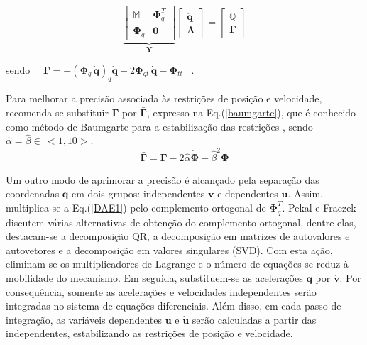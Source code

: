 \documentclass[]{politex}
\begin{document}
\begin{equation}
\underbrace{\left[ \begin{array}{cc}
\mathbb{M} & \boldsymbol{\Phi}_q^T \\
\boldsymbol{\Phi}_q & \mathbf{0}
\end{array}
\right]}_{\mathbf{Y}}
\left[ \begin{array}{c}
\ddot{\mathbf{q}} \\
\boldsymbol{\Lambda}
\end{array}
\right] =
\left[ \begin{array}{c}
\mathbb{Q} \\
\boldsymbol{\Gamma}
\end{array}
\right]
\label{DAE3}
\end{equation}

\vspace{0.5cm}

sendo  \, \, $\boldsymbol{\Gamma} = -(\boldsymbol{\Phi}_q \, \dot{\mathbf{q}})_q \dot{\mathbf{q}} - 2 \boldsymbol{\Phi}_{qt} \, \dot{\mathbf{q}} - \boldsymbol{\Phi}_{tt}$ \, .

\vspace{0.5cm}

Para melhorar a precisão associada às restrições de posição e velocidade, recomenda-se substituir $\boldsymbol{\Gamma}$ por $\bar{\boldsymbol{\Gamma}}$, expresso na Eq.(\ref{baumgarte}), que é conhecido como método de Baumgarte para a estabilização das restrições \cite{nikravesh}, sendo $\hat{\alpha} = \hat{\beta} \in \, <1,10>$. 
%
\begin{equation}
\bar{\boldsymbol{\Gamma}} = \boldsymbol{\Gamma} - 2\hat{\alpha} \boldsymbol{\dot{\Phi}} - \hat{\beta}^2 \boldsymbol{\Phi}
\label{baumgarte}
\end{equation}


Um outro modo de aprimorar a precisão é alcançado pela separação das coordenadas $\mathbf{q}$ em dois grupos: independentes $\mathbf{v}$ e dependentes $\mathbf{u}$. Assim, multiplica-se a Eq.(\ref{DAE1}) pelo complemento ortogonal \cite{iran} de $\boldsymbol{\Phi}_q^T$. Pekal e Fraczek \cite{pekalb} discutem várias alternativas de obtenção do complemento ortogonal, dentre elas, destacam-se a decomposição QR, a decomposição em matrizes de autovalores e autovetores e a decomposição em valores singulares (SVD). Com esta ação, eliminam-se os multiplicadores de Lagrange e o número de equações se reduz à mobilidade do mecanismo. Em seguida, substituem-se as acelerações $\ddot{\mathbf{q}}$ por $\ddot{\mathbf{v}}$. Por consequência, somente as acelerações e velocidades independentes serão integradas no sistema de equações diferenciais. Além disso, em cada passo de integração, as variáveis dependentes $\mathbf{u}$ e $\dot{\mathbf{u}}$ serão calculadas a partir das independentes, estabilizando as restrições de posição e velocidade.
\end{document}

